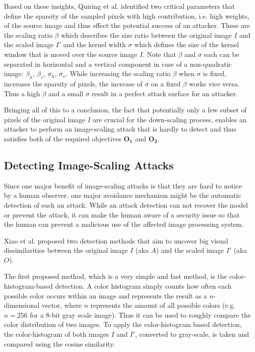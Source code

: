 \documentclass[sigconf]{acmart}
\begin{document}
Based on these insights, Quiring et al. identified two critical parameters that define the sparsity of the sampled pixels with high contribution, i.e. high weights, of the source image and thus effect the potential success of an attacker.
These are the scaling ratio $\beta$ which describes the size ratio between the original image $I$ and the scaled image $I'$ and the kernel width $\sigma$ which defines the size of the kernel window that is moved over the source image $I$.
Note that $\beta$ and $\sigma$ each can be separated in horizontal and a vertical component in case of a non-quadratic image: ${\beta}_h$, ${\beta}_v$, ${\sigma}_h$, ${\sigma}_v$.
While increasing the scaling ratio $\beta$ when $\sigma$ is fixed, increases the sparsity of pixels, the increase of $\sigma$ on a fixed $\beta$ works vice versa.
Thus a high $\beta$ and a small $\sigma$ result in a perfect attack surface for an attacker. 

Bringing all of this to a conclusion, the fact that potentially only a few subset of pixels of the original image $I$ are crucial for the down-scaling process, enables an attacker to perform an image-scaling attack that  is hardly to detect and thus satisfies both of the required objectives $\boldsymbol{O_1}$ and $\boldsymbol{O_2}$.

\subsection{Detecting Image-Scaling Attacks}
\label{sec:detection}
Since one major benefit of image-scaling attacks is that they are hard to notice by a human observer, one major avoidance mechanism might be the automatic detection of such an attack.
While an attack detection can not recover the model or prevent the attack, it can make the human aware of a security issue so that the human can prevent a malicious use of the affected image processing system.

Xiao et al.\cite{camouflage} proposed two detection methods that aim to uncover big visual dissimilarities between the original image $I$ (aka $A$) and the scaled image $I'$ (aka $O$).

The first proposed method, which is a very simple and fast method, is the color-histogram-based detection.
A color histogram simply counts how often each possible color occurs within an image and represents the result as a $n$-dimensional vector, where $n$ represents the amount of all possible colors (e.g. $n = 256$ for a $8$-bit gray scale image).
Thus it can be used to roughly compare the color distribution of two images.
To apply the color-histogram based detection, the color-histogram of both images $I$ and $I'$, converted to gray-scale, is taken and compared using the cosine similarity.
\end{document}
